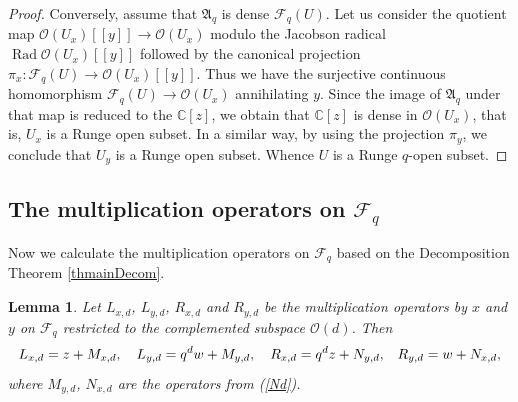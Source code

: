 \documentclass[12pt,reqno]{amsart}%
\theoremstyle{plain}
\newtheorem{lemma}{Lemma}
\numberwithin{theorem}{section} \numberwithin{equation}{section}
\numberwithin{lemma}{section}
\numberwithin{remark}{section}
\numberwithin{example}{section}
\numberwithin{proposition}{section}
\numberwithin{definition}{section}
\numberwithin{corollary}{section}
\begin{document}
\begin{proof}
Conversely, assume that $\mathfrak{A}_{q}$ is dense $\mathcal{F}_{q}\left(
U\right)  $. Let us consider the quotient map $\mathcal{O}\left(
U_{x}\right)  \left[  \left[  y\right]  \right]  \rightarrow\mathcal{O}\left(
U_{x}\right)  $ modulo the Jacobson radical $\operatorname{Rad}\mathcal{O}%
\left(  U_{x}\right)  \left[  \left[  y\right]  \right]  $ followed by the
canonical projection $\pi_{x}:\mathcal{F}_{q}\left(  U\right)  \rightarrow
\mathcal{O}\left(  U_{x}\right)  \left[  \left[  y\right]  \right]  $. Thus we
have the surjective continuous homomorphism $\mathcal{F}_{q}\left(  U\right)
\rightarrow\mathcal{O}\left(  U_{x}\right)  $ annihilating $y$. Since the
image of $\mathfrak{A}_{q}$ under that map is reduced to the $\mathbb{C}%
\left[  z\right]  $, we obtain that $\mathbb{C}\left[  z\right]  $ is dense in
$\mathcal{O}\left(  U_{x}\right)  $, that is, $U_{x}$ is a Runge open subset.
In a similar way, by using the projection $\pi_{y}$, we conclude that $U_{y}$
is a Runge open subset. Whence $U$ is a Runge $q$-open subset.
\end{proof}

\subsection{The multiplication operators on $\mathcal{F}_{q}$}

Now we calculate the multiplication operators on $\mathcal{F}_{q}$ based on
the Decomposition Theorem \ref{thmainDecom}.

\begin{lemma}
\label{lemMO1}Let $L_{x,d}$, $L_{y,d}$, $R_{x,d}$ and $R_{y,d}$ be the
multiplication operators by $x$ and $y$ on $\mathcal{F}_{q}$ restricted to the
complemented subspace $\mathcal{O}\left(  d\right)  $. Then
\[
L_{x,d}=z+M_{x,d},\quad L_{y,d}=q^{d}w+M_{y,d},\quad R_{x,d}=q^{d}%
z+N_{y,d}\text{,\quad}R_{y,d}=w+N_{x,d},
\]
where $M_{y,d}$, $N_{x,d}$ are the operators from (\ref{Nd}).
\end{lemma}
\end{document}
